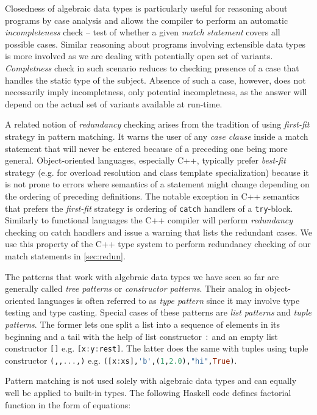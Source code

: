 \documentclass[preprint]{sigplanconf}
\makeatletter
\DeclareRobustCommand{\code}[1]{{\lstinline[breaklines=false,escapechar=@]{#1}}}
\DeclareRobustCommand{\codehaskell}[1]{{\lstinline[breaklines=false,language=Haskell]{#1}}}
\makeatother
\begin{document}
Closedness of algebraic data types is particularly useful for reasoning about 
programs by case analysis and allows the compiler to perform an automatic 
\emph{incompleteness} check -- test of whether a given \emph{match statement} 
covers all possible cases. Similar reasoning about programs involving extensible 
data types is more involved as we are dealing with potentially open set of 
variants. \emph{Completness} check in such scenario reduces to checking presence 
of a case that handles the static type of the subject. Absence of such a case,
however, does not necessarily imply incompletness, only potential incompletness, 
as the answer will depend on the actual set of variants available at run-time.

A related notion of \emph{redundancy} checking arises from the 
tradition of using \emph{first-fit} strategy in pattern matching. It warns the 
user of any \emph{case clause} inside a match statement that will 
never be entered because of a preceding one being more general. Object-oriented 
languages, especially C++, typically prefer \emph{best-fit} strategy (e.g. for 
overload resolution and class template specialization) because it is not prone 
to errors where semantics of a statement might change depending on the ordering 
of preceding definitions. The notable exception in C++ semantics that prefers 
the \emph{first-fit} strategy is ordering of \code{catch} handlers of a 
\code{try}-block. Similarly to functional languages the C++ compiler will perform 
\emph{redundancy} checking on catch handlers and issue a warning that lists the 
redundant cases. We use this property of the C++ type system to perform redundancy 
checking of our match statements in \textsection\ref{sec:redun}.

The patterns that work with algebraic data types we have seen so far are 
generally called \emph{tree patterns} or \emph{constructor patterns}. Their 
analog in object-oriented languages is often referred to as \emph{type pattern} 
since it may involve type testing and type casting. Special cases of these patterns 
are \emph{list patterns} and \emph{tuple patterns}. The former lets one split a 
list into a sequence of elements in its beginning and a tail with the help of 
list constructor \codehaskell{:} and an empty list constructor \codehaskell{[]} 
e.g. \codehaskell{[x:y:rest]}. The latter does the same with tuples using tuple
constructor \codehaskell{(,,...,)} e.g. \codehaskell{([x:xs],'b',(1,2.0),"hi",True)}.

Pattern matching is not used solely with algebraic data types and can equally 
well be applied to built-in types. The following Haskell code defines factorial 
function in the form of equations:
\end{document}
